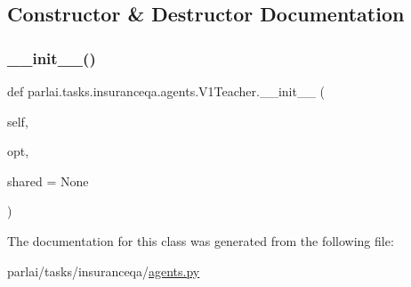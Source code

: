 \subsection{Constructor \& Destructor Documentation}
\mbox{\label{classparlai_1_1tasks_1_1insuranceqa_1_1agents_1_1V1Teacher_aa41a7ca1c1c437a0d1bb4bf93549446a}} 
\subsubsection{\texorpdfstring{\+\_\+\+\_\+init\+\_\+\+\_\+()}{\_\_init\_\_()}}
{\footnotesize\ttfamily def parlai.\+tasks.\+insuranceqa.\+agents.\+V1\+Teacher.\+\_\+\+\_\+init\+\_\+\+\_\+ (\begin{DoxyParamCaption}\item[{}]{self,  }\item[{}]{opt,  }\item[{}]{shared = {\ttfamily None} }\end{DoxyParamCaption})}



The documentation for this class was generated from the following file\+:\begin{DoxyCompactItemize}
\item 
parlai/tasks/insuranceqa/\hyperlink{parlai_2tasks_2insuranceqa_2agents_8py}{agents.\+py}\end{DoxyCompactItemize}
